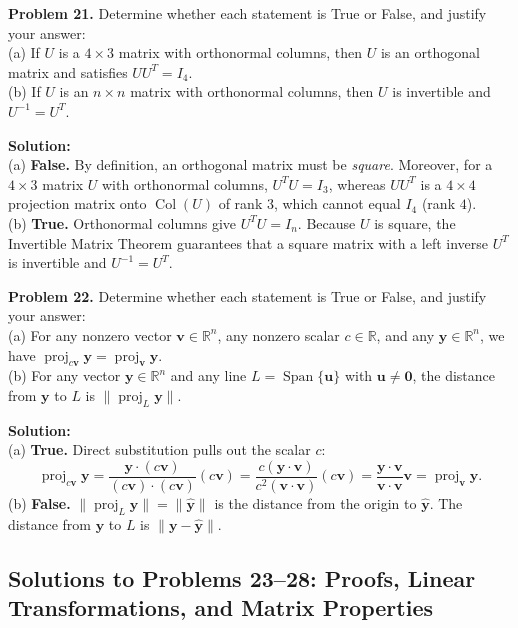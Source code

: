 \documentclass[11pt, letterpaper]{article}
\theoremstyle{definition}
\theoremstyle{remark}
\begin{document}
\textbf{Problem 21.} Determine whether each statement is True or False, and justify your answer: \\
(a) If $U$ is a $4 \times 3$ matrix with orthonormal columns, then $U$ is an orthogonal matrix and satisfies $U U^T = I_4$. \\
(b) If $U$ is an $n \times n$ matrix with orthonormal columns, then $U$ is invertible and $U^{-1} = U^T$.

\textbf{Solution:} \\
(a) \textbf{False.} By definition, an orthogonal matrix must be \textit{square}. Moreover, for a $4 \times 3$ matrix $U$ with orthonormal columns, $U^T U = I_3$, whereas $U U^T$ is a $4 \times 4$ projection matrix onto $\operatorname{Col}(U)$ of rank $3$, which cannot equal $I_4$ (rank $4$). \\
(b) \textbf{True.} Orthonormal columns give $U^T U = I_n$. Because $U$ is square, the Invertible Matrix Theorem guarantees that a square matrix with a left inverse $U^T$ is invertible and $U^{-1} = U^T$.

\textbf{Problem 22.} Determine whether each statement is True or False, and justify your answer: \\
(a) For any nonzero vector $\mathbf{v} \in \mathbb{R}^n$, any nonzero scalar $c \in \mathbb{R}$, and any $\mathbf{y} \in \mathbb{R}^n$, we have $\operatorname{proj}_{c\mathbf{v}} \mathbf{y} = \operatorname{proj}_{\mathbf{v}} \mathbf{y}$. \\
(b) For any vector $\mathbf{y} \in \mathbb{R}^n$ and any line $L = \operatorname{Span}\{\mathbf{u}\}$ with $\mathbf{u} \neq \mathbf{0}$, the distance from $\mathbf{y}$ to $L$ is $\|\operatorname{proj}_L \mathbf{y}\|$.

\textbf{Solution:} \\
(a) \textbf{True.} Direct substitution pulls out the scalar $c$:
\[
\operatorname{proj}_{c\mathbf{v}} \mathbf{y} = \frac{\mathbf{y} \cdot (c\mathbf{v})}{(c\mathbf{v}) \cdot (c\mathbf{v})}(c\mathbf{v}) = \frac{c(\mathbf{y} \cdot \mathbf{v})}{c^2(\mathbf{v} \cdot \mathbf{v})}(c\mathbf{v}) = \frac{\mathbf{y} \cdot \mathbf{v}}{\mathbf{v} \cdot \mathbf{v}}\mathbf{v} = \operatorname{proj}_{\mathbf{v}} \mathbf{y}.
\]
(b) \textbf{False.} $\|\operatorname{proj}_L \mathbf{y}\| = \|\hat{\mathbf{y}}\|$ is the distance from the origin to $\hat{\mathbf{y}}$. The distance from $\mathbf{y}$ to $L$ is $\|\mathbf{y} - \hat{\mathbf{y}}\|$.

\subsection{Solutions to Problems 23--28: Proofs, Linear Transformations, and Matrix Properties}
\end{document}
